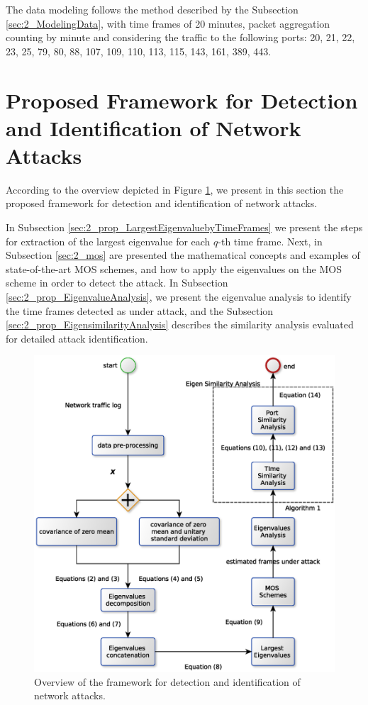 The data modeling follows the method described by the Subsection \ref{sec:2_ModelingData}, with time frames of 20 minutes, packet aggregation counting by minute and considering the traffic to the following ports: 20, 21, 22, 23, 25, 79, 80, 88, 107, 109, 110, 113, 115, 143, 161, 389, 443.

\section{Proposed Framework for Detection and Identification of Network Attacks}
\label{sec:2_prop_getv}

According to the overview depicted in Figure \ref{fig:2.08}, we present in this section the proposed framework for detection and identification of network attacks. 

In Subsection \ref{sec:2_prop_LargestEigenvaluebyTimeFrames} we present the steps for extraction of the largest eigenvalue for each $q$-th time frame. Next, in Subsection \ref{sec:2_mos} are presented the mathematical concepts and examples of state-of-the-art MOS schemes, and how to apply the eigenvalues on the MOS scheme in order to detect the attack. In Subsection \ref{sec:2_prop_EigenvalueAnalysis}, we present the eigenvalue analysis to identify the time frames detected as under attack, and the Subsection \ref{sec:2_prop_EigensimilarityAnalysis} describes the similarity analysis evaluated for detailed attack identification.

\begin{figure}[h!]
	\centering
     \includegraphics[width=12cm]{figures/ch2/mos_eigen_similarity.eps}
     \caption{Overview of the framework for detection and identification of network attacks.}
     \label{fig:2.08}
\end{figure}

